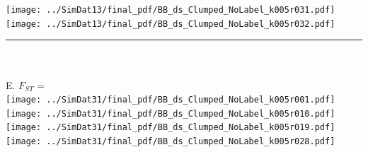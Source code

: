 \documentclass[varwidth=true, border={80, 10}]{standalone}
\newlength{\nameraise}
\newlength{\nameoverhang}
\begin{document}
\texttt{[image: ../SimDat13/final\_pdf/BB\_ds\_Clumped\_NoLabel\_k005r031.pdf]}~\hspace*{-\nameoverhang}\raisebox{\nameraise}{FLOCK (1/9)} \\
\texttt{[image: ../SimDat13/final\_pdf/BB\_ds\_Clumped\_NoLabel\_k005r032.pdf]}~\hspace*{-\nameoverhang}\raisebox{\nameraise}{FLOCK (1/9)} \\
\noindent\rule[.5cm]{8.2in}{0.4pt}\\
\vspace{-2.5em}\\
E. $F_{ST}$ = \\
\texttt{[image: ../SimDat31/final\_pdf/BB\_ds\_Clumped\_NoLabel\_k005r001.pdf]}~\hspace*{-\nameoverhang}\raisebox{\nameraise}{STRUCTURE A.C (9/9)} \\
\texttt{[image: ../SimDat31/final\_pdf/BB\_ds\_Clumped\_NoLabel\_k005r010.pdf]}~\hspace*{-\nameoverhang}\raisebox{\nameraise}{STRUCTURE NA.C (9/9)} \\
\texttt{[image: ../SimDat31/final\_pdf/BB\_ds\_Clumped\_NoLabel\_k005r019.pdf]}~\hspace*{-\nameoverhang}\raisebox{\nameraise}{STRUCTURE NA.NC  (9/9)} \\
\texttt{[image: ../SimDat31/final\_pdf/BB\_ds\_Clumped\_NoLabel\_k005r028.pdf]}~\hspace*{-\nameoverhang}\raisebox{\nameraise}{FLOCK (1/9)*} \\
\end{document}
